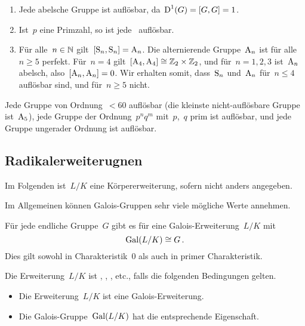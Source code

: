 \begin{example}
  \leavevmode
  \begin{enumerate}
    \item
      Jede abelsche Gruppe ist auflösbar, da~$\operatorname{D}^1(G) = [G,G] = 1$.
    \item
      Ist~$p$ eine Primzahl, so ist jede~ auflösbar.
    \item
      Für alle~$n \in \mathbb{N}$ gilt~$[\operatorname{S}_n, \operatorname{S}_n] = \operatorname{A}_n$.
      Die alternierende Gruppe~$\operatorname{A}_n$ ist für alle~$n \geq 5$ perfekt.
      Für~$n = 4$ gilt~$[\operatorname{A}_4, \operatorname{A}_4] \cong \mathbb{Z}_2 \times \mathbb{Z}_2$, und für~$n = 1, 2, 3$ ist~$\operatorname{A}_n$ abelsch, also~$[\operatorname{A}_n, \operatorname{A}_n] = 0$.
      Wir erhalten somit, dass~$\operatorname{S}_n$ und~$\operatorname{A}_n$ für~$n \leq 4$ auflösbar sind, und für~$n \geq 5$ nicht.
  \end{enumerate}
\end{example}

\begin{remark}
  Jede Gruppe von Ordnung~$< 60$ auflösbar (die kleinste nicht-auflösbare Gruppe ist~$\operatorname{A}_5$), jede Gruppe der Ordnung~$p^n q^m$ mit~$p$,~$q$ prim ist auflösbar, und jede Gruppe ungerader Ordnung ist auflösbar.
\end{remark}



\subsection{Radikalerweiterugnen}

\begin{convention}
  Im Folgenden ist~$L/K$ eine Körpererweiterung, sofern nicht anders angegeben.
\end{convention}

Im Allgemeinen können Galois-Gruppen sehr viele mögliche Werte annehmen.

\begin{theorem}
  Für jede endliche Gruppe~$G$ gibt es für eine Galois-Erweiterung~$L/K$ mit
  \[
    \operatorname{Gal}(L/K) \cong G \,.
  \]
  Dies gilt sowohl in Charakteristik~$0$ als auch in primer Charakteristik.
\end{theorem}

\begin{definition}
  Die Erweiterung~$L/K$ ist , , , etc., falls die folgenden Bedingungen gelten.
  \begin{itemize}
    \item
      Die Erweiterung~$L/K$ ist eine Galois-Erweiterung.
    \item
      Die Galois-Gruppe~$\operatorname{Gal}(L/K)$ hat die entsprechende Eigenschaft.
  \end{itemize}
\end{definition}

